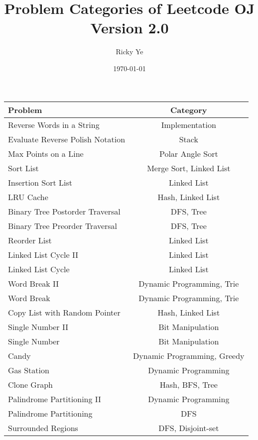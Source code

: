 \documentclass[paper=a4, fontsize=11pt]{scrartcl} %
\begin{document}
\title{Problem Categories of Leetcode OJ\\\textnormal{\small{Version 2.0}}}
\author{Ricky Ye}
\date{\today}
\maketitle

\setlength\parindent{0pt}
\small
\begin{center}
  \begin{longtable}{|l|c|}
    \hline
    \textbf{Problem}        &   \textbf{Category}    \\
    \hline
    Reverse Words in a String   &   Implementation  \\
    Evaluate Reverse Polish Notation    &   Stack   \\
    Max Points on a Line    &   Polar Angle Sort    \\
    Sort List   &   Merge Sort, Linked List \\
    Insertion Sort List &   Linked List \\
    LRU Cache   &   Hash, Linked List\\
    Binary Tree Postorder Traversal &   DFS, Tree   \\
    Binary Tree Preorder Traversal  &   DFS, Tree   \\
    Reorder List    &   Linked List \\
    Linked List Cycle II    &   Linked List \\
    Linked List Cycle   &   Linked List \\
    Word Break II   &   Dynamic Programming, Trie\\
    Word Break  &   Dynamic Programming, Trie\\
    Copy List with Random Pointer   &   Hash, Linked List\\
    Single Number II    &   Bit Manipulation    \\
    Single Number   &   Bit Manipulation    \\
    Candy   &    Dynamic Programming, Greedy\\
    Gas Station &   Dynamic Programming \\
    Clone Graph &   Hash, BFS, Tree \\
    Palindrome Partitioning II  &   Dynamic Programming \\
    Palindrome Partitioning &   DFS   \\
    Surrounded Regions  &   DFS, Disjoint-set    \\

\end{longtable}
\end{center}
\end{document}
